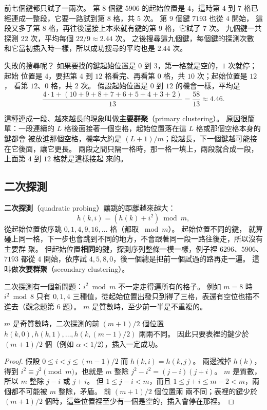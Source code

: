 前七個鍵都只試了一兩次。 第 $8$ 個鍵 $5906$ 的起始位置是 $4$，這時第 $4$ 到 $7$ 格已
經連成一整段，它要一路試到第 $8$ 格，共 $5$ 次。 第 $9$ 個鍵 $7193$ 也從 $4$ 開始，
這段又多了第 $8$ 格，再往後還接上本來就有鍵的第 $9$ 格，它試了 $7$ 次。 九個鍵一共
探測 $22$ 次，平均每個 $22/9 \approx 2.44$ 次。 之後搜尋這九個鍵，每個鍵的探測次數
和它當初插入時一樣，所以成功搜尋的平均也是 $2.44$ 次。

失敗的搜尋呢？ 如果要找的鍵起始位置是 $0$ 到 $3$，第一格就是空的，$1$ 次就停；起始
位置是 $4$，要把第 $4$ 到 $12$ 格看完、再看第 $0$ 格，共 $10$ 次；起始位置是 $12$，
看第 $12$、$0$ 格，共 $2$ 次。 假設起始位置是 $0$ 到 $12$ 的機會一樣，平均是
\[
\frac{4 \cdot 1 + (10 + 9 + 8 + 7 + 6 + 5 + 4 + 3 + 2)}{13} = \frac{58}{13} \approx 4.46.
\]

這種連成一段、越來越長的現象叫做\textbf{主要群聚}（primary clustering）。 原因很簡
單：一段連續的 $L$ 格後面接著一個空格，起始位置落在這 $L$ 格或那個空格本身的鍵都會
被放進那個空格，機率大約是 $(L + 1)/m$；段越長，下一個鍵越可能接在它後面，讓它更長。
兩段之間只隔一格時，那一格一填上，兩段就合成一段，上面第 $4$ 到 $12$ 格就是這樣接起
來的。

\subsection{二次探測}

\textbf{二次探測}（quadratic probing）讓跳的距離越來越大：
\[
h(k, i) = (h(k) + i^2) \bmod m,
\]
從起始位置依序跳 $0, 1, 4, 9, 16, \ldots$ 格（都取 $\bmod m$）。 起始位置不同的鍵，
就算碰上同一格，下一步也會跳到不同的地方，不會跟著同一段一路往後走，所以沒有主要群
聚。 但起始位置\textbf{相同}的鍵，探測序列整條一模一樣，例子裡 $6296$、$5906$、
$7193$ 都從 $4$ 開始，依序試 $4, 5, 8, 0$，後一個總是把前一個試過的路再走一遍。 這
叫做\textbf{次要群聚}（secondary clustering）。

二次探測有一個新問題：$i^2 \bmod m$ 不一定走得遍所有的格子。 例如 $m = 8$ 時
$i^2 \bmod 8$ 只有 $0, 1, 4$ 三種值，從起始位置出發只到得了三格，表還有空位也插不
進去（觀念題第 6 題）。 $m$ 是質數時，至少前一半是不重複的。

\begin{theorem}
\label{thm:hash-quad}
$m$ 是奇質數時，二次探測的前 $(m+1)/2$ 個位置
$h(k, 0), h(k, 1), \ldots, h(k, (m-1)/2)$ 兩兩不同。 因此只要表裡的鍵少於
$(m+1)/2$ 個（例如 $\alpha < 1/2$），插入一定成功。
\end{theorem}

\begin{proof}
假設 $0 \le i < j \le (m-1)/2$ 而 $h(k, i) = h(k, j)$。 兩邊減掉 $h(k)$，得到
$i^2 \equiv j^2 \pmod m$，也就是 $m$ 整除 $j^2 - i^2 = (j - i)(j + i)$。 $m$ 是質數，
所以 $m$ 整除 $j - i$ 或 $j + i$。 但 $1 \le j - i < m$，而且
$1 \le j + i \le m - 2 < m$，兩個都不可能被 $m$ 整除，矛盾。 前 $(m+1)/2$ 個位置兩
兩不同；表裡的鍵少於 $(m+1)/2$ 個時，這些位置裡至少有一個是空的，插入會停在那裡。
\end{proof}

